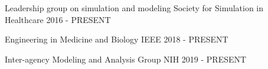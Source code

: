 
\begin{cventries}

  \cventry
    {Leadership group on simulation and modeling} %
    {Society for Simulation in Healthcare} %
    {} %
    {2016 - PRESENT} %
    {
    }

      \cventry
    {Engineering in Medicine and Biology} %
    {IEEE} %
    {} %
    {2018 - PRESENT} %
    {
    }

      \cventry
    {Inter-agency Modeling and Analysis Group } %
    {NIH } %
    {} %
    {2019 - PRESENT} %
    {
    }



\end{cventries}
